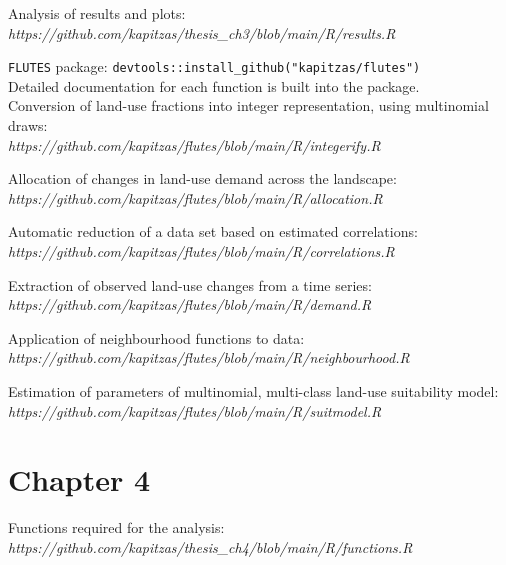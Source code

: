\documentclass[titlesmallcaps,copyrightpage]{uomthesis}\usepackage[]{graphicx}\usepackage[]{color}
\begin{document}
\noindent Analysis of results and plots: \\
\textit{https://github.com/kapitzas/thesis\_ch3/blob/main/R/results.R}
\vspace{0.3cm}
\newpage

\noindent \texttt{FLUTES} package: \texttt{devtools::install\_github("kapitzas/flutes")}\\
\noindent Detailed documentation for each function is built into the package. \\

\noindent Conversion of land-use fractions into integer representation, using multinomial draws: \\
\textit{https://github.com/kapitzas/flutes/blob/main/R/integerify.R}
\vspace{0.3cm}

\noindent Allocation of changes in land-use demand across the landscape: \\
\textit{https://github.com/kapitzas/flutes/blob/main/R/allocation.R}
\vspace{0.3cm}

\noindent Automatic reduction of a data set based on estimated correlations: \\
\textit{https://github.com/kapitzas/flutes/blob/main/R/correlations.R}
\vspace{0.3cm}

\noindent Extraction of observed land-use changes from a time series: \\
\textit{https://github.com/kapitzas/flutes/blob/main/R/demand.R}
\vspace{0.3cm}

\noindent Application of neighbourhood functions to data: \\
\textit{https://github.com/kapitzas/flutes/blob/main/R/neighbourhood.R}
\vspace{0.3cm}

\noindent Estimation of parameters of multinomial, multi-class land-use suitability model: \\
\textit{https://github.com/kapitzas/flutes/blob/main/R/suitmodel.R}
\vspace{0.3cm}

\section{Chapter 4}
\noindent Functions required for the analysis: \\
\textit{https://github.com/kapitzas/thesis\_ch4/blob/main/R/functions.R}
\vspace{0.3cm}
\end{document}
